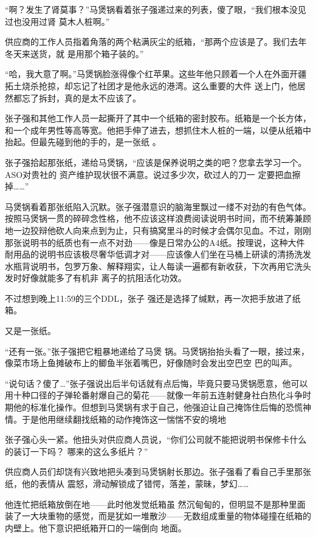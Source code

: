 \documentclass{article}
\begin{document}
\newpage

“啊？发生了肾莫事？”马煲锅看着张子强递过来的列表，傻了眼，“我们根本没见过也没用过肾
莫木人桩啊。” 

供应商的工作人员指着角落的两个粘满灰尘的纸箱，“那两个应该是了。我们去年冬天来送货，就
是用那个箱子装的。” 

“哈，我大意了啊。”马煲锅脸涨得像个红苹果。这些年他只顾着一个人在外面开疆拓土烧杀抢掠，却忘记了社团才是他永远的港湾。这么重要的大件
送上门，他居然都忘了拆封，真的是太不应该了。 

张子强和其他工作人员一起撕开了其中一个纸箱的密封胶布。纸箱是一个长方体，和一个成年男性等高等宽。他把手伸了进去，想抓住木人桩的一端，以便从纸箱中抬起。但最先碰到他的手的，是一张纸
。 

张子强拾起那张纸，递给马煲锅，“应该是保养说明之类的吧？您拿去学习一个。ASO对贵社的
\newpage
资产维护现状很不满意。说过多少次，砍过人的刀一
定要把血擦掉……” 

马煲锅看着那张纸陷入沉默。张子强潜意识的脑海里飘过一缕不对劲的有色气体。按照马煲锅一贯的碎碎念性格，他不应该这样浪费阅读说明书时间，而不统筹兼顾地一边狡辩他砍人向来点到为止，只有搞窝里斗的时候才会偶尔见血。不过，刚刚那张说明书的纸质也有一点不对劲——像是日常办公的A4纸。按理说，这种大件耐用品的说明书应该极尽奢华低调才对——应该像人们坐在马桶上研读的清扬洗发水瓶背说明书，包罗万象、解释翔实，让人每读一遍都有新收获，下次再用它洗头发时好像就能多了有机非
离子的抗阻活化功效。 

不过想到晚上11:59的三个DDL，张子
强还是选择了缄默，再一次把手放进了纸箱。 


又是一张纸。 

“还有一张。”张子强把它粗暴地递给了马煲
\newpage
锅。马煲锅抬抬头看了一眼，接过来，像菜市场上鱼摊破布上的鲫鱼半张着嘴巴，好像随时会发出空巴空
巴的叫声。 

“说句话？傻了…”张子强说出后半句话就有点后悔，毕竟只要马煲锅愿意，他可以用十种口径的子弹轮番射爆自己的菊花——就像一年前五连射健身社白热化斗争时期他的标准化操作。但想到马煲锅有求于自己，他强迫让自己掩饰住后悔的恐慌神情。于是他用继续翻找纸箱的动作掩饰这一惴惴不安的境地


张子强心头一紧。他扭头对供应商人员说，“你们公司就不能把说明书保修卡什么的装订一下吗？
哪来的这么多纸片？” 

供应商人员们却饶有兴致地把头凑到马煲锅射长那边。张子强看了看自己手里那张纸，他的表情从
震怒，滑动解锁成了错愕，落差，蒙昧，梦幻…… 

他连忙把纸箱放倒在地——此时他发觉纸箱虽
\newpage
然沉甸甸的，但明显不是那种里面装了一大块重物的感觉，而是犹如一堆散沙——无数组成重量的物体碰撞在纸箱的内壁上。他下意识把纸箱开口的一端倒向
地面。 
\end{document}
